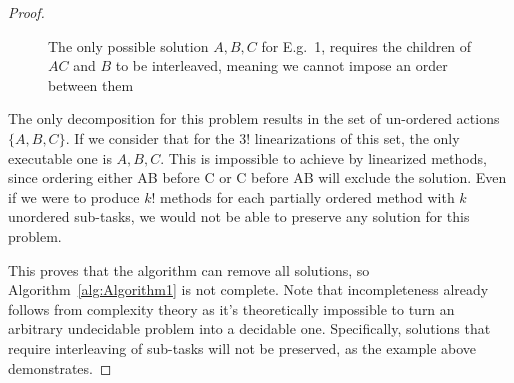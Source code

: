 \documentclass[letterpaper]{article}
\newtheorem{proof}{Proof}
\begin{document}
\begin{proof}
\begin{figure}
{\begin{subfigure}{7cm}
			\end{subfigure}	
		}
	\end{figure}
	
	\begin{figure}
		\caption{The only possible solution $A, B, C$ for E.g.\ 1, requires the children of $AC$ and $B$ to be interleaved, meaning we cannot impose an order between them}
	\end{figure}
	
	The only decomposition for this problem results in the set of un-ordered actions $\{A, B, C\}$.
	If we consider that for the $3!$ linearizations of this set, the only executable one is $A, B, C$. This is impossible to achieve by linearized methods, since ordering either AB before C or C before AB will exclude the solution. 
	Even if we were to produce $k!$ methods for each partially ordered method with $k$ unordered sub-tasks, we would not be able to preserve any solution for this problem.
	
	This proves that the algorithm can remove all solutions, so Algorithm~\ref{alg:Algorithm1} is not complete. Note that incompleteness already follows from complexity theory as it's theoretically impossible to turn an arbitrary undecidable problem into a decidable one.
	Specifically, solutions that require interleaving of sub-tasks will not be preserved, as the example above demonstrates.
\end{proof}
\end{document}
